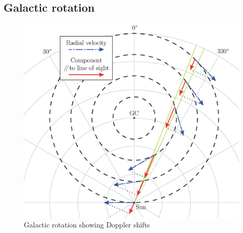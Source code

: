 \documentclass[a4paper, titlepage, oneside]{article}
\begin{document}
\begin{multicols}{2}
\subsection{Galactic rotation}
\label{sec:gal-rot}

\begin{figure}[H]
  \centering
  \includegraphics[width = \columnwidth]{figures/galactic-rotation}
  \caption{Galactic rotation showing Doppler shifts}
  \label{fig:gal-rot}
\end{figure}


\end{multicols}
\end{document}

